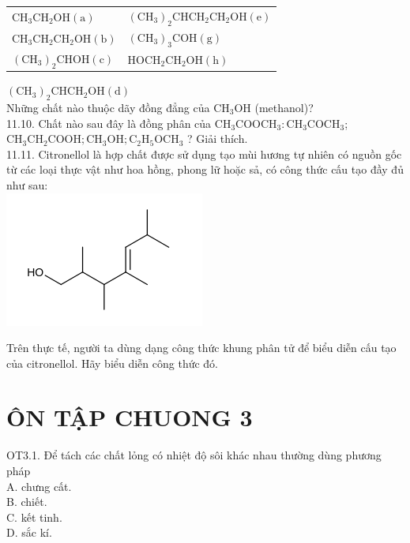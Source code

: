 \documentclass[10pt]{article}
\begin{document}
\begin{center}
\begin{tabular}{ll}
$\mathrm{CH}_{3} \mathrm{CH}_{2} \mathrm{OH}(\mathrm{a})$ & $\left(\mathrm{CH}_{3}\right)_{2} \mathrm{CHCH}_{2} \mathrm{CH}_{2} \mathrm{OH}(\mathrm{e})$ \\
$\mathrm{CH}_{3} \mathrm{CH}_{2} \mathrm{CH}_{2} \mathrm{OH}(\mathrm{b})$ & $\left(\mathrm{CH}_{3}\right)_{3} \mathrm{COH}(\mathrm{g})$ \\
$\left(\mathrm{CH}_{3}\right)_{2} \mathrm{CHOH}(\mathrm{c})$ & $\mathrm{HOCH}_{2} \mathrm{CH}_{2} \mathrm{OH}(\mathrm{h})$ \\
\end{tabular}
\end{center}

$\left(\mathrm{CH}_{3}\right)_{2} \mathrm{CHCH}_{2} \mathrm{OH}(\mathrm{d})$\\
Những chất nào thuộc dãy đồng đẳng của $\mathrm{CH}_{3} \mathrm{OH}$ (methanol)?\\
11.10. Chất nào sau đây là đồng phân của $\mathrm{CH}_{3} \mathrm{COOCH}_{3}: \mathrm{CH}_{3} \mathrm{COCH}_{3}$; $\mathrm{CH}_{3} \mathrm{CH}_{2} \mathrm{COOH} ; \mathrm{CH}_{3} \mathrm{OH} ; \mathrm{C}_{2} \mathrm{H}_{5} \mathrm{OCH}_{3}$ ? Giải thích.\\
11.11. Citronellol là hợp chất được sử dụng tạo mùi hương tự nhiên có nguồn gốc từ các loại thực vật như hoa hồng, phong lữ hoặc sả, có công thức cấu tạo đầy đủ như sau:\\
\includegraphics{smile-45749b16a338ea26579ba2f91dc788b82955ef2f}

Trên thực tế, người ta dùng dạng công thức khung phân tử để biểu diễn cấu tạo của citronellol. Hãy biểu diễn công thức đó.

\section*{ÔN TẬP CHUONG 3}
OT3.1. Để tách các chất lỏng có nhiệt độ sôi khác nhau thường dùng phương pháp\\
A. chưng cất.\\
B. chiết.\\
C. kết tinh.\\
D. sắc kí.
\end{document}
